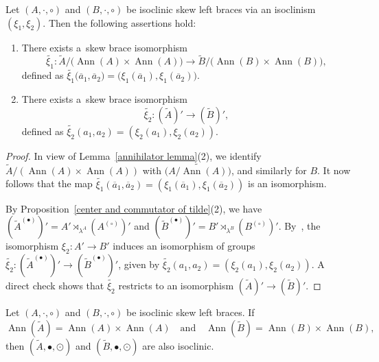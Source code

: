\documentclass{jonasart}
\theoremstyle{plain}
\DeclareMathOperator{\Ann}{Ann}
\begin{document}
	\begin{proposition}
		Let $(A,\cdot,\circ)$ and $(B,\cdot,\circ)$ be isoclinic skew left braces via an isoclinism $(\xi_1, \xi_2 )$. Then the following assertions hold:
		\begin{enumerate}
			\item There exists a~skew brace isomorphism
			\[
			\widetilde{\xi_1}: \widetilde{A}/\big(\Ann(A)\times\Ann(A)\big)\to \widetilde{B}/\big(\Ann(B)\times\Ann(B)\big),
			\]
			defined as $\widetilde{\xi_1} \big(\overline{a}_1, \overline{a}_2 \big)= \big(\xi_1 (\overline{a}_1 ),\xi_1 (\overline{a}_2 ) \big)$.
			\item There exists a~skew brace isomorphism
			\[
			\widetilde{\xi_2}:(\widetilde{A})' \to (\widetilde{B})',
			\]
			defined as $\widetilde{\xi_2}(a_1, a_2)=(\xi_2 (a_1), \xi_2 (a_2))$.
		\end{enumerate}
		
	\end{proposition}
	
	\begin{proof}
		In view of Lemma~\ref{annihilator lemma}(2), we identify
		$\widetilde{A}/ (\Ann(A) \times \Ann(A))$ with $\big(\widetilde{A/ \Ann(A)}\big) $, and similarly for $B$. It now follows that the map $\widetilde{\xi_1}(\overline{a}_1,\overline{a}_2 )=(\xi_1 (\overline{a}_1 ),\xi_1 (\overline{a}_2 ))$ is an isomorphism.
		
		By Proposition~\ref{center and commutator of tilde}(2), we have $(\widetilde{A}^{(\bullet)})'=A' \rtimes_{\lambda^A} (A^{(\circ)})'$ and $(\widetilde{B}^{(\bullet)})'=B' \rtimes_{\lambda^B} (B^{(\circ)})'$. By~\cite[Theorem 3.13]{RSU24}, the isomorphism $\xi_2:A' \to B'$ induces an isomorphism of groups $\widetilde{\xi_2}:(\widetilde{A}^{(\bullet)})' \to (\widetilde{B}^{(\bullet)})'$, given by $\widetilde{\xi_2}(a_1,a_2 )=(\xi_2 (a_1 ),\xi_2 (a_2 ))$. A direct check shows that $\widetilde{\xi_2}$ restricts to an isomorphism $(\widetilde{A})' \to (\widetilde{B})'$.
	\end{proof}
	
	\begin{theorem}\label{theorem isoclinicsdp}
		Let $(A,\cdot,\circ)$ and $(B,\cdot,\circ)$ be isoclinic skew left braces. If
		\[
		\Ann(\widetilde{A}) = \Ann(A) \times \Ann(A)
		\quad \text{and} \quad
		\Ann(\widetilde{B}) = \Ann(B) \times \Ann(B),
		\]
		then $(\widetilde{A},\bullet,\odot)$ and $(\widetilde{B},\bullet,\odot)$ are also isoclinic.
	\end{theorem}
	
\end{document}
